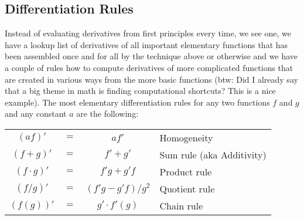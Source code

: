 \subsection{Differentiation Rules}
Instead of evaluating derivatives from first principles every time, we see one, we have a lookup list of derivatives of all important elementary functions that has been assembled once and for all by the technique above or otherwise and we have a couple of rules how to compute derivatives of more complicated functions that are created in various ways from the more basic functions (btw: Did I already say that a big theme in math is finding computational shortcuts? This is a nice example). The most elementary differentiation rules for any two functions $f$ and $g$ and any constant $a$ are the following:

\medskip
\begin{tabular}{c c c l}
  $(a f)'$        &$=$& $ a f'$              & Homogeneity \\
  $(f + g)'$      &$=$& $f' + g'$            & Sum rule (aka Additivity) \\
  $(f \cdot g)'$  &$=$& $f' g + g' f$        & Product rule \\
  $(f / g)'$      &$=$& $(f' g - g' f)/g^2$  & Quotient rule \\
  $(f( g))'$      &$=$& $g' \cdot f'(g)$     & Chain rule \\
\end{tabular}
\medskip



